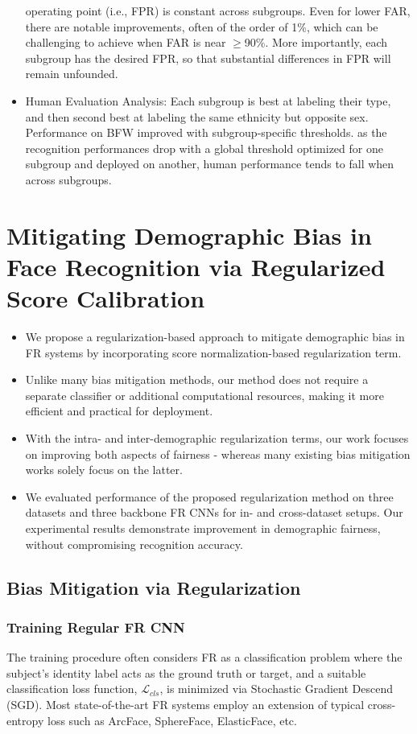 \documentclass[12pt]{article}
\begin{document}
\begin{itemize}
  operating point (i.e., FPR) is constant across subgroups. Even for lower FAR, there are notable improvements, often of the order of 1\%, which can be challenging to achieve when FAR is near $\geq$90\%. More
  importantly, each subgroup has the desired FPR,
  so that substantial differences in FPR will remain
  unfounded. 
  \item Human Evaluation Analysis:  Each subgroup is best at labeling their type, and then second best at labeling
  the same ethnicity but opposite sex. Performance on BFW improved with subgroup-specific thresholds.  as the recognition performances drop with a global threshold optimized for
  one subgroup and deployed on another, human performance tends to fall when across subgroups.  
\end{itemize}
\section{Mitigating Demographic Bias in Face Recognition via
Regularized Score Calibration}
\begin{itemize}
  \item We propose a regularization-based approach to mitigate demographic bias in FR systems by incorporating
  score normalization-based regularization term.
  \item Unlike many bias mitigation methods, our method
  does not require a separate classifier or additional
  computational resources, making it more efficient and
  practical for deployment.
  \item With the intra- and inter-demographic regularization
  terms, our work focuses on improving both aspects of
  fairness - whereas many existing bias mitigation
  works solely focus on the latter.
  \item We evaluated performance of the proposed regularization method on three datasets and three backbone FR CNNs for in- and cross-dataset setups. Our experimental results demonstrate improvement in demographic
  fairness, without compromising recognition accuracy.
\end{itemize}
\subsection{Bias Mitigation via Regularization}
\subsubsection{Training Regular FR CNN}
The training
procedure often considers FR as a classification problem
where the subject's identity label acts as the ground truth
or target, and a suitable classification loss function, $\mathcal{L}_{cls}$, is
minimized via Stochastic Gradient Descend (SGD). 
Most state-of-the-art FR systems employ an extension of typical cross-entropy loss such as ArcFace,
SphereFace, ElasticFace, etc.
\end{document}
